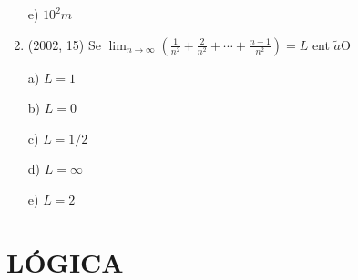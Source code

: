 \documentclass{article}
\begin{document}
\begin{enumerate}
e) $10^{2} m$ \newline





\item(2002, 15) Se $\lim _{n \rightarrow \infty}\left(\frac{1}{n^{2}}+\frac{2}{n^{2}}+\cdots+\frac{n-1}{n^{2}}\right)=L$ ent $\tilde{a} \mathrm{O}$

a) $L=1$

b) $L=0$

c) $L=1 / 2$

d) $L=\infty$

e) $L=2$ \newline

\end{enumerate}











\newpage
\section{LÓGICA}
\end{document}
